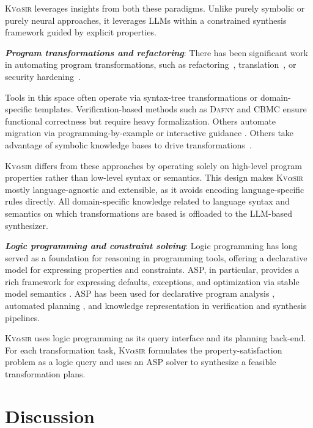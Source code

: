 \documentclass[nonacm,sigplan,review]{acmart}
\newcommand{\sys}{{\scshape Kv{$\alpha$}sir}\xspace}
\newcommand{\heading}[1]{\vspace{2pt}\noindent\textbf{\emph{#1}}:\enspace}
\begin{document}
\sys leverages insights from both these paradigms.
Unlike purely symbolic or purely neural approaches, it leverages LLMs within a
constrained synthesis framework guided by explicit properties.

\heading{Program transformations and refactoring}
There has been significant work in automating program transformations,
such as refactoring~\cite{Fowler99,Mens04,Myers16,burson1990program}, translation~\cite{kopetzki2021towards,ledley1962automatic}, or security hardening~\cite{vasilakis2018breakapp,mir:ccs:2021, rebau2001dependable}. %

Tools in this space often operate via syntax-tree transformations or
domain-specific templates.
Verification-based methods such as \textsc{Dafny}
\cite{leino2016dafny} and \textsc{CBMC} \cite{Clarke04} ensure functional correctness
but require heavy formalization.
Others automate migration via
programming-by-example or interactive guidance \cite{gulwani2017program, le2017interactive}.
Others take advantage of symbolic knowledge bases to drive transformations~\cite{burson1990program}.

\sys differs from these approaches by operating solely on high-level program
properties rather than low-level syntax or semantics.
This design makes \sys
mostly language-agnostic and extensible, as it avoids encoding language-specific rules
directly.
All domain-specific knowledge related to language
syntax and semantics on which transformations are based is offloaded to the LLM-based synthesizer.

\heading{Logic programming and constraint solving}
Logic programming has long served as a foundation for reasoning in programming
tools, offering a declarative model for expressing properties and constraints.
ASP, in particular, provides a rich framework for
expressing defaults, exceptions, and optimization via stable model semantics
\cite{Gelfond_2000, Gelfond_2002, Eiter_2009}. 
ASP has been used for
declarative program analysis \cite{benton2007interactive}, automated planning
\cite{nguyen2020explainable, son2022answersetplanningsurvey}, and knowledge
representation in verification and synthesis pipelines.

\sys uses logic programming as its query interface and its planning back-end.
For each transformation task, \sys formulates the property-satisfaction problem as a logic query and uses an ASP solver to synthesize a feasible transformation plans.

\section{Discussion}
\label{sec:discussion}
\end{document}
